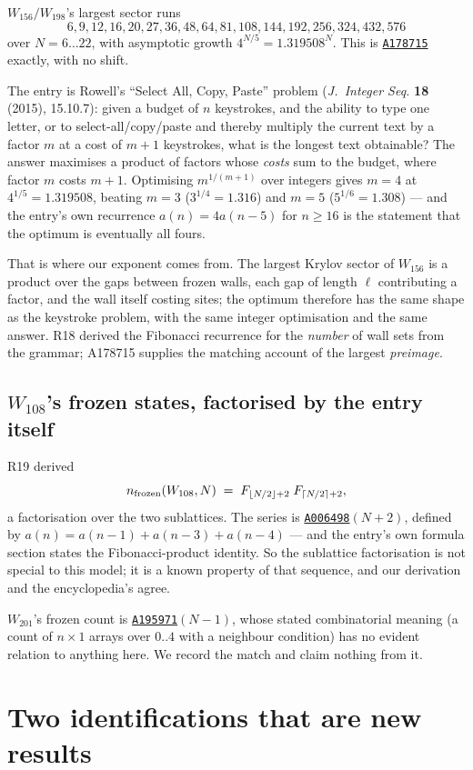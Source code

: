\documentclass[11pt]{article}
\newcommand{\oeis}[1]{\href{https://oeis.org/#1}{\texttt{#1}}}
\theoremstyle{plain}
\begin{document}
$W_{156}/W_{198}$'s largest sector runs
\[
6, 9, 12, 16, 20, 27, 36, 48, 64, 81, 108, 144, 192, 256, 324, 432, 576
\]
over $N=6\ldots22$, with asymptotic growth $4^{N/5}=1.319508^N$. This is
\oeis{A178715} exactly, with no shift.

The entry is Rowell's ``Select All, Copy, Paste'' problem
(\emph{J.\ Integer Seq.} \textbf{18} (2015), 15.10.7): given a budget of $n$
keystrokes, and the ability to type one letter, or to select-all/copy/paste and
thereby multiply the current text by a factor $m$ at a cost of $m+1$ keystrokes,
what is the longest text obtainable? The answer maximises a product of factors
whose \emph{costs} sum to the budget, where factor $m$ costs $m+1$. Optimising
$m^{1/(m+1)}$ over integers gives $m=4$ at $4^{1/5}=1.319508$, beating $m=3$
($3^{1/4}=1.316$) and $m=5$ ($5^{1/6}=1.308$) --- and the entry's own recurrence
$a(n)=4a(n-5)$ for $n\ge16$ is the statement that the optimum is eventually all
fours.

That is where our exponent comes from. The largest Krylov sector of
$W_{156}$ is a product over the gaps between frozen walls, each gap of length
$\ell$ contributing a factor, and the wall itself costing sites; the optimum
therefore has the same shape as the keystroke problem, with the same integer
optimisation and the same answer. R18 derived the Fibonacci recurrence for the
\emph{number} of wall sets from the grammar; A178715 supplies the matching
account of the largest \emph{preimage}.

\subsection{$W_{108}$'s frozen states, factorised by the entry itself}

R19 derived
\[
n_{\rm frozen}(W_{108}, N) \;=\; F_{\lfloor N/2\rfloor+2}\;
F_{\lceil N/2\rceil+2},
\]
a factorisation over the two sublattices. The series is \oeis{A006498}$(N+2)$,
defined by $a(n)=a(n-1)+a(n-3)+a(n-4)$ --- and the entry's own formula section
states the Fibonacci-product identity. So the sublattice factorisation is not
special to this model; it is a known property of that sequence, and our
derivation and the encyclopedia's agree.

$W_{201}$'s frozen count is \oeis{A195971}$(N-1)$, whose stated combinatorial
meaning (a count of $n\times1$ arrays over $0..4$ with a neighbour condition) has
no evident relation to anything here. We record the match and claim nothing
from it.

\section{Two identifications that are new results}
\end{document}
